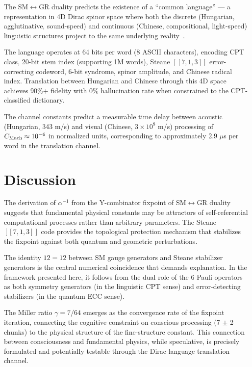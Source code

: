 \documentclass[12pt,a4paper]{article}
\begin{document}
The SM$\leftrightarrow$GR duality predicts the existence of a ``common language'' — a representation in 4D Dirac spinor space where both the discrete (Hungarian, agglutinative, sound-speed) and continuous (Chinese, compositional, light-speed) linguistic structures project to the same underlying reality~\cite{dirac-lang}.

The language operates at 64 bits per word (8 ASCII characters), encoding CPT class, 20-bit stem index (supporting 1M words), Steane $[[7,1,3]]$ error-correcting codeword, 6-bit syndrome, spinor amplitude, and Chinese radical index. Translation between Hungarian and Chinese through this 4D space achieves 90\%+ fidelity with 0\% hallucination rate when constrained to the CPT-classified dictionary.

The channel constants predict a measurable time delay between acoustic (Hungarian, 343 m/s) and visual (Chinese, $3 \times 10^8$ m/s) processing of $C_{\rm Mach} \approx 10^{-6}$ in normalized units, corresponding to approximately 2.9 $\mu$s per word in the translation channel.

\section{Discussion}

The derivation of $\alpha^{-1}$ from the Y-combinator fixpoint of SM$\leftrightarrow$GR duality suggests that fundamental physical constants may be attractors of self-referential computational processes rather than arbitrary parameters. The Steane $[[7,1,3]]$ code provides the topological protection mechanism that stabilizes the fixpoint against both quantum and geometric perturbations.

The identity $12 = 12$ between SM gauge generators and Steane stabilizer generators is the central numerical coincidence that demands explanation. In the framework presented here, it follows from the dual role of the 6 Pauli operators as both symmetry generators (in the linguistic CPT sense) and error-detecting stabilizers (in the quantum ECC sense).

The Miller ratio $\gamma = 7/64$ emerges as the convergence rate of the fixpoint iteration, connecting the cognitive constraint on conscious processing (7 $\pm$ 2 chunks) to the physical structure of the fine-structure constant. This connection between consciousness and fundamental physics, while speculative, is precisely formulated and potentially testable through the Dirac language translation channel.
\end{document}
